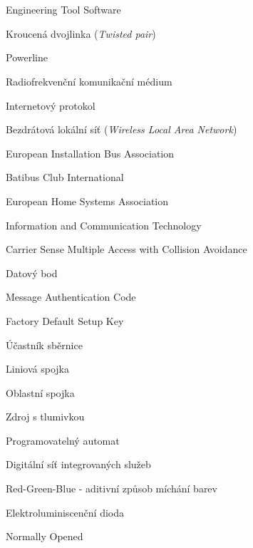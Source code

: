 \cleardoublepage
\chapter*{\listofabbrevname}
{}

\begin{acronym}[KolikMista]

		{Engineering Tool Software}

		{Kroucená dvojlinka (\textit{Twisted pair})}
	
		{Powerline}

		{Radiofrekvenční komunikační médium}
		
		{Internetový protokol}
		
		{Bezdrátová lokální síť (\textit{Wireless Local Area Network})}
		
		{European Installation Bus Association}
	
		{Batibus Club International}
	
		{European Home Systems Association}
	
		{Information and Communication Technology}
	
		{Carrier Sense Multiple Access with Collision Avoidance}
	
		{Datový bod}
	
		{Message Authentication Code}
	
		{Factory Default Setup Key}
	
		{Účastník sběrnice}
	
		{Liniová spojka}
	
		{Oblastní spojka}
	
		{Zdroj s tlumivkou}
	
		{Programovatelný automat}
	
		{Digitální síť integrovaných služeb}
	
		{Red-Green-Blue - aditivní způsob míchání barev}
	
		{Elektroluminiscenční dioda}
	
		{Normally Opened}
	
\end{acronym}
